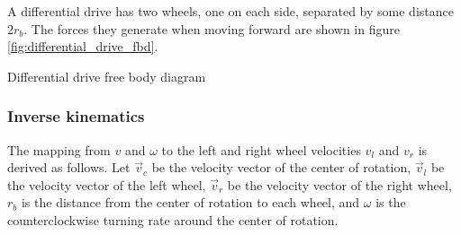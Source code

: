 A differential drive has two wheels, one on each side, separated by some
distance $2r_b$. The forces they generate when moving forward are shown in
figure \ref{fig:differential_drive_fbd}.
\begin{bookfigure}

  \caption{Differential drive free body diagram}
  \label{fig:differential_drive_fbd}
\end{bookfigure}

\subsubsection{Inverse kinematics}

The mapping from $v$ and $\omega$ to the left and right wheel velocities $v_l$
and $v_r$ is derived as follows. Let $\vec{v}_c$ be the velocity vector of the
center of rotation, $\vec{v}_l$ be the velocity vector of the left wheel,
$\vec{v}_r$ be the velocity vector of the right wheel, $r_b$ is the distance
from the center of rotation to each wheel, and $\omega$ is the counterclockwise
turning rate around the center of rotation.

